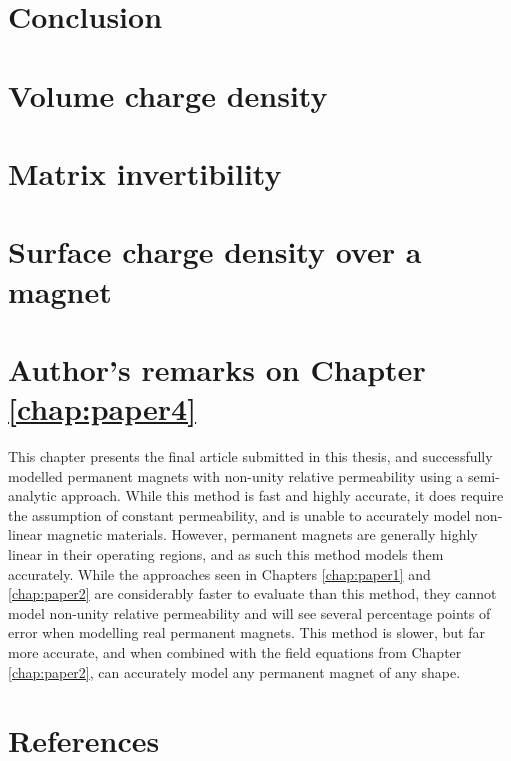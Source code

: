 \section{Conclusion}\label{sec:p4conclusion}

\begin{subappendices}
\renewcommand{\thesection}{Appendix \arabic{chapter}.\Alph{section}}
\section{Volume charge density}\label{sec:p4noVolumeCharge}

\section{Matrix invertibility}\label{sec:p4invertibleMatrix}

\section{Surface charge density over a magnet}\label{sec:p4integralSigma}

\end{subappendices}
\clearpage
\section*{Author's remarks on Chapter \ref{chap:paper4}}
This chapter presents the final article submitted in this thesis, and successfully modelled permanent magnets with non-unity relative permeability using a semi-analytic approach. While this method is fast and highly accurate, it does require the assumption of constant permeability, and is unable to accurately model non-linear magnetic materials. However, permanent magnets are generally highly linear in their operating regions, and as such this method models them accurately. While the approaches seen in Chapters \ref{chap:paper1} and \ref{chap:paper2} are considerably faster to evaluate than this method, they cannot model non-unity relative permeability and will see several percentage points of error when modelling real permanent magnets. This method is slower, but far more accurate, and when combined with the field equations from Chapter \ref{chap:paper2}, can accurately model any permanent magnet of any shape.

\newpage
\section*{References}
\printbibliography[heading=none]
